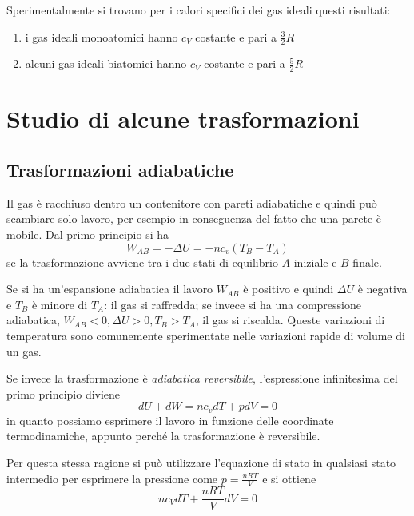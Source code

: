 \documentclass[class=book, crop=false, oneside, 12pt]{standalone}
\begin{document}
Sperimentalmente si trovano per i calori specifici dei gas ideali questi risultati:
\begin{enumerate}
    \item i gas ideali monoatomici hanno \(c_V\) costante e pari a \(\frac{3}{2} R\)
    \item alcuni gas ideali biatomici hanno \(c_V\) costante e pari a \(\frac{5}{2} R\)
\end{enumerate}

\section{Studio di alcune trasformazioni}

\subsection{Trasformazioni adiabatiche}

Il gas è racchiuso dentro un contenitore con pareti adiabatiche e quindi può scambiare solo lavoro, per esempio in conseguenza del fatto che una parete è mobile. 
Dal primo principio si ha
\begin{equation*}
    W_{AB} = - \Delta U = - n c_v (T_B -T_A)
\end{equation*}
se la trasformazione avviene tra i due stati di equilibrio \(A\) iniziale e \(B\) finale. 

Se si ha un'espansione adiabatica il lavoro \(W_{AB}\) è positivo e quindi \(\Delta U\) è negativa e \(T_B\) è minore di \(T_A\): il gas si raffredda; se invece si ha una compressione adiabatica, \(W_{AB}<0, \Delta U > 0 , T_B > T_A\), il gas si riscalda. 
Queste variazioni di temperatura sono comunemente sperimentate nelle variazioni rapide di volume di un gas.

Se invece la trasformazione è \emph{adiabatica reversibile}, l'espressione infinitesima del primo principio diviene
\begin{equation*}
    d U + d W = n c_v d T + p d V = 0
\end{equation*}
in quanto possiamo esprimere il lavoro in funzione delle coordinate termodinamiche, appunto perché la trasformazione è reversibile.

Per questa stessa ragione si può utilizzare l'equazione di stato in qualsiasi stato intermedio per esprimere la pressione come \(p = \frac{n R T}{V}\) e si ottiene
\begin{equation*}
    n c_V d T + \frac{n R T}{V} d V = 0
\end{equation*}
\end{document}
